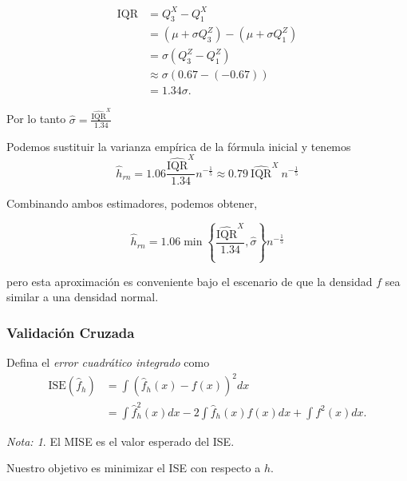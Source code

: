 \documentclass[
  12pt,
]{book}
\theoremstyle{definition}
\theoremstyle{definition}
\theoremstyle{definition}
\theoremstyle{definition}
\theoremstyle{remark}
\newtheorem*{remark}{Nota: }
\begin{document}
\begin{align*}
\mathrm{IQR}
& = Q^{X}_{3} - Q^{X}_{1}                                                     \\
& = \left( \mu+\sigma Q^{Z}_{3} \right) - \left( \mu+\sigma Q^{Z}_{1} \right) \\
& = \sigma \left(Q^{Z}_{3} - Q^{Z}_{1} \right)                                \\
& \approx \sigma \left( 0.67 - (-0.67) \right)                                 \\
& =1.34 \sigma.
\end{align*}

Por lo tanto
\(\displaystyle \hat{\sigma} = \frac{\widehat{\mathrm{IQR}}^{X}}{1.34}\)

Podemos sustituir la varianza empírica de la fórmula inicial y tenemos
\begin{equation*}
\hat{h}_{rn} = 1.06 \frac{\widehat{\mathrm{IQR}}^{X}}{1.34} n^{-\frac{1}{5}} \approx 0.79\  \widehat{\mathrm{IQR}}^{X}\ n^{-\frac{1}{5}}
\end{equation*}

Combinando ambos estimadores, podemos obtener,

\begin{equation*}
\hat{h}_{rn} = 1.06 \min \left\{\frac{\widehat{\mathrm{IQR}}^{X}}{1.34}, \hat{\sigma }\right\} n^{-\frac{1}{5}}
\end{equation*}

pero esta aproximación es conveniente bajo el escenario de que la densidad \(f\) sea similar a una densidad normal.

\hypertarget{validaciuxf3n-cruzada}{%
\subsubsection{Validación Cruzada}\label{validaciuxf3n-cruzada}}

Defina el \emph{error cuadrático integrado} como \begin{align*}
\mathrm{ISE}(\hat{f}_{h}) & =\int\left(\hat{f}_{h}(x)-f(x)\right)^{2}dx\nonumber                   \\
& =\int \hat{f}_{h}^{2}(x)dx-2\int \hat{f}_{h}(x)f(x)dx+\int f^{2}(x)dx.
\end{align*}

\begin{remark}
El MISE es el valor esperado del ISE.
\end{remark}

Nuestro objetivo es minimizar el ISE con respecto a \(h\).
\end{document}
